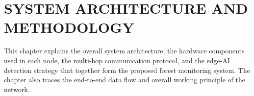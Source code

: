 %

\chapter{SYSTEM ARCHITECTURE AND METHODOLOGY}

This chapter explains the overall system architecture, the hardware components used
in each node, the multi-hop communication protocol, and the edge-AI detection
strategy that together form the proposed forest monitoring system. The chapter also
traces the end-to-end data flow and overall working principle of the network.






\clearpage